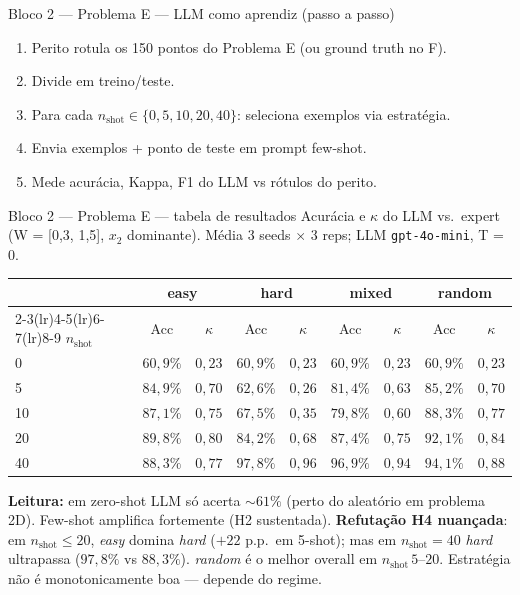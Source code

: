 \documentclass[aspectratio=169,10pt]{beamer}
\begin{document}
\begin{frame}{Bloco 2 --- Problema E --- LLM como aprendiz (passo a passo)}
  \scriptsize
  \begin{enumerate}
    \item Perito rotula os 150 pontos do Problema E (ou ground truth no F).
    \item Divide em treino/teste.
    \item Para cada $n_{\text{shot}} \in \{0, 5, 10, 20, 40\}$: seleciona exemplos via estrat\'egia.
    \item Envia exemplos + ponto de teste em prompt few-shot.
    \item Mede acur\'acia, Kappa, F1 do LLM vs r\'otulos do perito.
  \end{enumerate}
\end{frame}

\begin{frame}{Bloco 2 --- Problema E --- tabela de resultados}
  \scriptsize
  Acur\'acia e $\kappa$ do LLM vs.\ expert (W = [0,3, 1,5], $x_2$ dominante). M\'edia 3 seeds $\times$ 3 reps; LLM \texttt{gpt-4o-mini}, T = 0.
  \begin{center}
  \begin{tabular}{lcccccccc}
    \toprule
    & \multicolumn{2}{c}{easy} & \multicolumn{2}{c}{hard} & \multicolumn{2}{c}{mixed} & \multicolumn{2}{c}{random} \\
    \cmidrule(lr){2-3}\cmidrule(lr){4-5}\cmidrule(lr){6-7}\cmidrule(lr){8-9}
    $n_{\text{shot}}$ & Acc & $\kappa$ & Acc & $\kappa$ & Acc & $\kappa$ & Acc & $\kappa$ \\
    \midrule
     0 & $60{,}9\%$ & $0{,}23$ & $60{,}9\%$ & $0{,}23$ & $60{,}9\%$ & $0{,}23$ & $60{,}9\%$ & $0{,}23$ \\
     5 & $84{,}9\%$ & $0{,}70$ & $62{,}6\%$ & $0{,}26$ & $81{,}4\%$ & $0{,}63$ & $85{,}2\%$ & $0{,}70$ \\
    10 & $87{,}1\%$ & $0{,}75$ & $67{,}5\%$ & $0{,}35$ & $79{,}8\%$ & $0{,}60$ & $88{,}3\%$ & $0{,}77$ \\
    20 & $89{,}8\%$ & $0{,}80$ & $84{,}2\%$ & $0{,}68$ & $87{,}4\%$ & $0{,}75$ & $92{,}1\%$ & $0{,}84$ \\
    40 & $88{,}3\%$ & $0{,}77$ & \textbf{$97{,}8\%$} & \textbf{$0{,}96$} & $96{,}9\%$ & $0{,}94$ & $94{,}1\%$ & $0{,}88$ \\
    \bottomrule
  \end{tabular}
  \end{center}
  \tiny
  \textbf{Leitura:} em zero-shot LLM s\'o acerta $\sim 61\%$ (perto do aleat\'orio em problema 2D). Few-shot amplifica fortemente (H2 sustentada). \textbf{Refuta\c{c}\~ao H4 nuan\c{c}ada}: em $n_{\text{shot}} \leq 20$, \emph{easy} domina \emph{hard} ($+22$ p.p.\ em 5-shot); mas em $n_{\text{shot}}=40$ \emph{hard} ultrapassa ($97{,}8\%$ vs $88{,}3\%$). \emph{random} \'e o melhor overall em $n_{\text{shot}}\,5$--$20$. Estrat\'egia n\~ao \'e monotonicamente boa --- depende do regime.
\end{frame}
\end{document}
